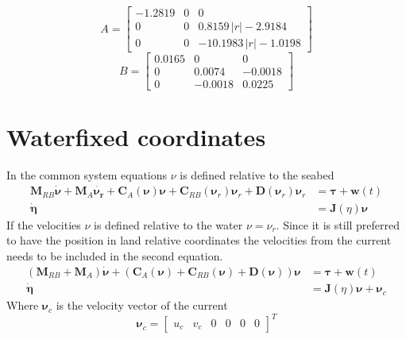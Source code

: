 \documentclass[12pt,a4]{article}
\begin{document}
\begin{equation*}
	A = \left[\begin{array}{ccc} -1.2819 & 0 & 0\\ 0 & 0 & 0.8159\,\left|r\right|-2.9184\\ 0 & 0 & -10.1983\,\left|r\right|-1.0198 \end{array}\right]
\end{equation*}
\begin{equation*}
	B = \left[\begin{array}{ccc} 0.0165 & 0 & 0\\ 0 & 0.0074 & -0.0018\\ 0 & -0.0018 & 0.0225 \end{array}\right]
\end{equation*}





\section{Waterfixed coordinates}
In the common system equations $\nu$ is defined relative to the seabed
\begin{align}
	\bm{M}_{RB}\bm{\dot{\nu}} + \bm{M}_{A}\bm{\dot{\nu_r}} + \bm{C}_{A}(\bm{\nu})\bm{\nu} + \bm{C}_{RB}(\bm{\nu}_r)\bm{\nu}_r + \bm{D}(\bm{\nu}_r)\bm{\nu}_r & = \bm{\tau} + \bm{w}(t) \\
	\bm{\dot{\eta}}                                                                                                                                          & = \bm{J}(\eta)\bm{\nu}
\end{align}
If the velocities $\nu$ is defined relative to the water $\nu = \nu_r$. Since it is still preferred to have the position in land relative coordinates the velocities from the current needs to be included in the second equation.
\begin{align}
	\left(\bm{M}_{RB} + \bm{M}_{A}  \right) \bm{\dot{\nu}} + \left(\bm{C}_{A}(\bm{\nu}) + \bm{C}_{RB}(\bm{\nu}) + \bm{D}(\bm{\nu})  \right)\bm{\nu} & = \bm{\tau} + \bm{w}(t)             \\
	\bm{\dot{\eta}}                                                                                                                                 & = \bm{J}(\eta)\bm{\nu} + \bm{\nu}_c
\end{align}
Where $\bm{\nu}_c$ is the velocity vector of the current
\begin{equation}
	\bm{\nu}_c =  \begin{bmatrix}u_c & v_c & 0 & 0 & 0 & 0 \end{bmatrix}^T
\end{equation}
\end{document}
